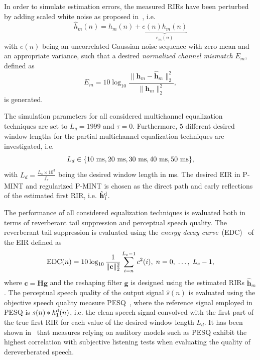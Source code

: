 \documentclass[draftcls,onecolumn,11pt]{IEEEtran}
\begin{document}
In order to simulate estimation errors, the measured RIRs have been perturbed by adding scaled white noise as proposed in~\cite{Cho_ITSA_1999}, i.e.
\begin{equation}
  \hat{h}_m(n) = h_m(n) + \underbrace{e(n)h_m(n)}_{e_m(n)}
\end{equation}
with $e(n)$ being an uncorrelated Gaussian noise sequence with zero mean and an appropriate variance, such that a desired \emph{normalized channel mismatch} $E_m$, defined as
\begin{equation}
E_m = 10 \log_{10} \frac{\|\mathbf{h}_m - \hat{\mathbf{h}}_m \|_2^2}{\|\mathbf{h}_m\|_2^2},
\end{equation}
is generated.

The simulation parameters for all considered multichannel equalization techniques are set to  $L_g = 1999$ and $\tau = 0$.
Furthermore, $5$ different desired window lengths for the partial multichannel equalization techniques are investigated, i.e.
\begin{equation}
L_d \in \{ 10~{\rm ms}, 20~{\rm ms}, 30~{\rm ms}, 40~{\rm ms}, 50~{\rm ms} \},
\end{equation}
with $L_d = \frac{L_s \times 10^3}{f_s}$ being the desired window length in ms.
The desired EIR in P-MINT and regularized P-MINT is chosen as the direct path and early reflections of the estimated first RIR, i.e. $\hat{\mathbf{h}}_1^{\rm d}$.

The performance of all considered equalization techniques is evaluated both in terms of reverberant tail suppression and perceptual speech quality.
The reverberant tail suppression is evaluated using the \emph{energy decay curve}~(EDC)~\cite{Naylor_Derev_book} of the EIR defined as
\begin{equation}
{\rm EDC}(n) = 10 \log_{10} \frac{1}{\|\mathbf{c}\|_2^2} \sum_{i = n}^{L_c-1} c^2(i), \; n =0, \; \ldots, \; L_c-1,
\end{equation}
where $\mathbf{c} = \mathbf{H}\mathbf{g}$ and the reshaping filter $\mathbf{g}$ is designed using the estimated RIRs $\hat{\mathbf{h}}_m$.
The perceptual speech quality of the output signal $\hat{s}(n)$ is evaluated using the objective speech quality measure PESQ~\cite{PESQ}, where the reference signal employed in PESQ is $s(n) \ast h_1^{\rm d}(n)$, i.e. the clean speech signal convolved with the first part of the true first RIR for each value of the desired window length $L_d$.
It has been shown in~\cite{Goetze_AES_2010} that measures relying on auditory models such as PESQ exhibit the highest correlation with subjective listening tests when evaluating the quality of dereverberated speech.
\end{document}
